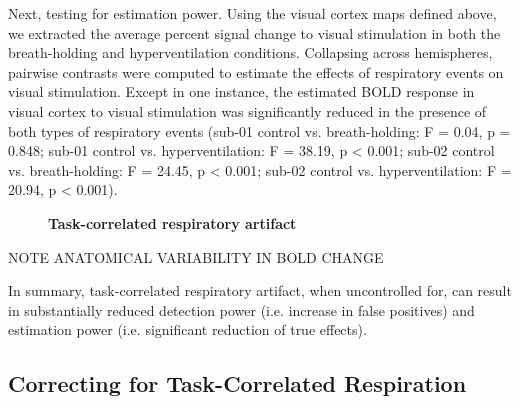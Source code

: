 \documentclass[9pt]{NEU502b-fmri}
\begin{document}
Next, testing for estimation power. Using the visual cortex maps defined above, we extracted the average percent signal change to visual stimulation in both the breath-holding and hyperventilation conditions. Collapsing across hemispheres, pairwise contrasts were computed to estimate the effects of respiratory events on visual stimulation. Except in one instance, the estimated BOLD response in visual cortex to visual stimulation was significantly reduced in the presence of both types of respiratory events (sub-01 control vs. breath-holding: F = 0.04, p = 0.848; sub-01 control vs. hyperventilation: F = 38.19, p < 0.001; sub-02 control vs. breath-holding: F = 24.45, p < 0.001; sub-02 control vs. hyperventilation: F = 20.94, p < 0.001). 

\begin{figure}
\centerline{%
%
}
\caption{\textbf{Task-correlated respiratory artifact}}

\end{figure}

NOTE ANATOMICAL VARIABILITY IN BOLD CHANGE

In summary, task-correlated respiratory artifact, when uncontrolled for, can result in substantially reduced detection power (i.e. increase in false positives) and estimation power (i.e. significant reduction of true effects). 

\subsection{Correcting for Task-Correlated Respiration}
\end{document}
